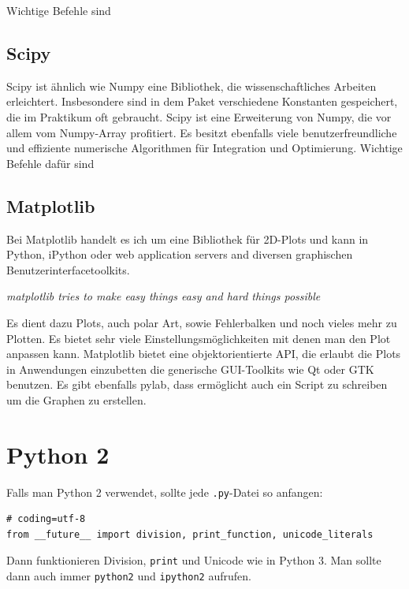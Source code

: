   Wichtige Befehle sind

\subsection{Scipy}
  Scipy ist ähnlich wie Numpy eine Bibliothek, die wissenschaftliches Arbeiten erleichtert.
  Insbesondere sind in dem Paket verschiedene Konstanten gespeichert, die im Praktikum oft gebraucht.
  Scipy ist eine Erweiterung von Numpy, die vor allem vom Numpy-Array profitiert.
  Es besitzt ebenfalls viele benutzerfreundliche und effiziente numerische Algorithmen für Integration und Optimierung.
  Wichtige Befehle dafür sind
\subsection{Matplotlib}
  Bei Matplotlib handelt es ich um eine Bibliothek für 2D-Plots und kann in Python, iPython oder web application servers and diversen graphischen Benutzerinterfacetoolkits.


  \textit{matplotlib tries to make easy things easy and hard things possible}


  Es dient dazu Plots, auch polar Art, sowie Fehlerbalken und noch vieles mehr zu Plotten.
  Es bietet sehr viele Einstellungsmöglichkeiten mit denen man den Plot anpassen kann.
  Matplotlib bietet eine objektorientierte API, die erlaubt die Plots in Anwendungen einzubetten die generische GUI-Toolkits wie Qt oder GTK benutzen.
  Es gibt ebenfalls pylab, dass ermöglicht auch ein Script zu schreiben um die Graphen zu erstellen.
\section{Python 2}
Falls man Python 2 verwendet, sollte jede \texttt{.py}-Datei so anfangen:
\begin{verbatim}
# coding=utf-8
from __future__ import division, print_function, unicode_literals
\end{verbatim}
Dann funktionieren Division, \texttt{print} und Unicode wie in Python 3.
Man sollte dann auch immer \texttt{python2} und \texttt{ipython2} aufrufen.
